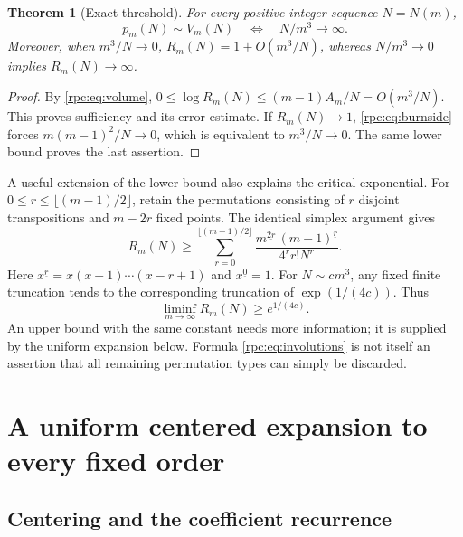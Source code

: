 \documentclass[11pt]{article}
\newtheorem{theorem}{Theorem}[section]
\theoremstyle{definition}
\theoremstyle{remark}
\newcommand{\fall}[2]{#1^{\underline{#2}}}
\numberwithin{equation}{section}
\begin{document}
\begin{theorem}[Exact threshold]\label{rpc:thm:iff}
For every positive-integer sequence $N=N(m)$,
\begin{equation}\label{rpc:eq:iff}
 p_m(N)\sim V_m(N)
 \quad\Longleftrightarrow\quad N/m^3\longrightarrow\infty.
\end{equation}
Moreover, when $m^3/N\to0$,
$R_m(N)=1+O(m^3/N)$, whereas $N/m^3\to0$ implies $R_m(N)\to\infty$.
\end{theorem}
\begin{proof}
By \eqref{rpc:eq:volume},
$0\le\log R_m(N)\le(m-1)A_m/N=O(m^3/N)$.
This proves sufficiency and its error estimate. If $R_m(N)\to1$,
\eqref{rpc:eq:burnside} forces $m(m-1)^2/N\to0$, which is equivalent to
$m^3/N\to0$. The same lower bound proves the last assertion.
\end{proof}

A useful extension of the lower bound also explains the critical exponential.
For $0\le r\le\lfloor(m-1)/2\rfloor$, retain the permutations consisting of
$r$ disjoint transpositions and $m-2r$ fixed points. The identical simplex
argument gives
\begin{equation}\label{rpc:eq:involutions}
 R_m(N)\ge
 \sum_{r=0}^{\lfloor(m-1)/2\rfloor}
 \frac{\fall m{2r}\,\fall{(m-1)}r}{4^r r!N^r}.
\end{equation}
Here $\fall xr=x(x-1)\cdots(x-r+1)$ and $\fall x0=1$.
For $N\sim c m^3$, any fixed finite truncation tends to the corresponding
truncation of $\exp(1/(4c))$. Thus
\[
 \liminf_{m\to\infty}R_m(N)\ge e^{1/(4c)}.
\]
An upper bound with the same constant needs more information; it is supplied
by the uniform expansion below. Formula \eqref{rpc:eq:involutions} is not itself
an assertion that all remaining permutation types can simply be discarded.

\section{A uniform centered expansion to every fixed order}\label{rpc:sec:centered}

\subsection{Centering and the coefficient recurrence}
\end{document}
